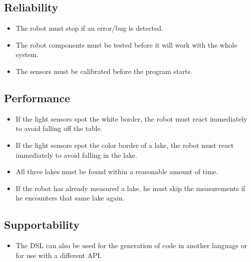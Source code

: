 \documentclass[10pt,a4paper]{article}
\begin{document}
\subsection*{Reliability}
\begin{itemize}
\item The robot must stop if an error/bug is detected.
\item The robot components must be tested before it will work with the whole system.
\item The sensors must be calibrated before the program starts.
\end{itemize}

\subsection*{Performance}
\begin{itemize}
\item If the light sensors spot the white border, the robot must react immediately to avoid falling off the table.
\item If the light sensors spot the color border of a lake, the robot must react immediately to avoid falling in the lake.
\item All three lakes must be found within a reasonable amount of time.
\item If the robot has already measured a lake, he must skip the measurements if he encounters that same lake again.
\end{itemize}

\subsection*{Supportability}
\begin{itemize}
\item The DSL can also be used for the generation of code in another language or for use with a different API.
\end{itemize}
\end{document}
